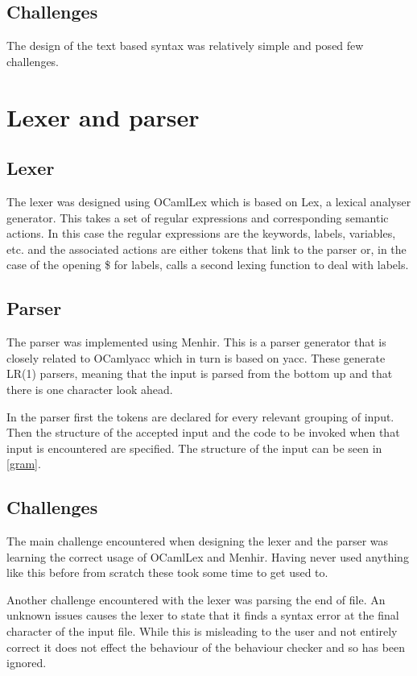 \subsection{Challenges}
The design of the text based syntax was relatively simple and posed few challenges. 

\section{Lexer and parser}

\subsection{Lexer}
The lexer was designed using OCamlLex which is based on Lex, a lexical analyser generator. This takes a set of regular expressions and corresponding semantic actions. In this case the regular expressions are the keywords, labels, variables, etc. and the associated actions are either tokens that link to the parser or, in the case of the opening \$ for labels, calls a second lexing function to deal with labels. 

\subsection{Parser}
The parser was implemented using Menhir. This is a parser generator that is closely related to OCamlyacc which in turn is based on yacc. These generate LR(1) parsers, meaning that the input is parsed from the bottom up and that there is one character look ahead. 

In the parser first the tokens are declared for every relevant grouping of input. Then the structure of the accepted input and the code to be invoked when that input is encountered are specified. The structure of the input can be seen in \ref{gram}.

\subsection{Challenges}
The main challenge encountered when designing the lexer and the parser was learning the correct usage of OCamlLex and Menhir. Having never used anything like this before from scratch these took some time to get used to. 

Another challenge encountered with the lexer was parsing the end of file. An unknown issues causes the lexer to state that it finds a syntax error at the final character of the input file. While this is misleading to the user and not entirely correct it does not effect the behaviour of the behaviour checker and so has been ignored. 

